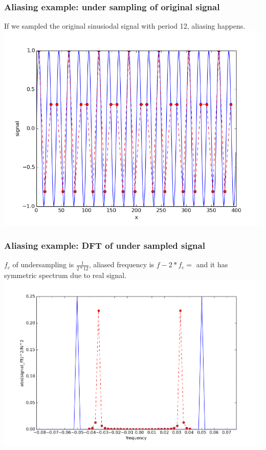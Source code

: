 \documentclass{beamer}
\begin{document}
\begin{frame}
\frametitle{Aliasing example: under sampling of original signal}
If we sampled the original sinusiodal signal with period 12, aliasing happens.\\
\includegraphics[scale=0.4]{undersample12.png}
\end{frame}
\begin{frame}
\frametitle{Aliasing example: DFT of under sampled signal}
$f_c$ of undersampling is $\frac{1}{2*12}$, aliased frequency is $f - 2*f_c = $ and it has symmetric spectrum due to real signal.
\includegraphics[scale=0.4]{undersample12_dft.png}
\end{frame}
\end{document}
